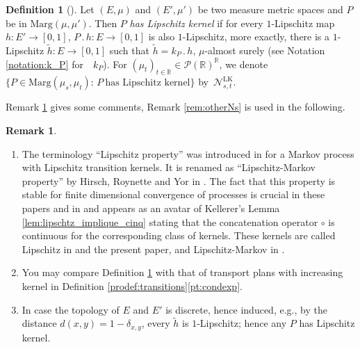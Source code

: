 \documentclass[JEP,XML,SOM,Unicode,NoEqCountersInSection,NoFloatCountersInSection,published]{cedram}
\newcommand{\ldot}{\mathbin{.}}
\theoremstyle{plain}
\theoremstyle{definition}
\newtheorem{defi}[them]{Definition}
\newtheorem{rem}[them]{Remark}
\newcommand{\ML}{\mathrm{LK}}
\newcommand{\p}{\mathcal{P}}
\newcommand{\ma}{\mathrm{Marg}}
\newcommand{\R}{\mathbb{R}}
\begin{document}
\begin{defi}[{\cite[Def.\,3]{Ke72}}]\label{defi:lipschitz} Let $(E,\mu)$ and $(E',\mu')$ be two measure metric spaces and $P$ be in $\ma(\mu,\mu')$. Then $P$ \emph{has Lipschitz kernel} if for every $1$-Lipschitz map $h:E'\to [0,1]$, $P\ldot h:E\to [0,1]$ is also $1$-Lipschitz, \ie more exactly, there is a $1$-Lipschitz $\tilde h:E\to [0,1]$ such that $\tilde h=k_P\ldot h$, $\mu$-almost surely (see Notation \ref{notation:k_P} for~ $k_P$). For $(\mu_t)_{t\in\R}\in\p(\R)^\R$, we denote $\{P\in\ma(\mu_s,\mu_t):\,P\ \text{has Lipschitz kernel}\}$ by~$\mathcal{N}^\ML_{s,t}$.
\end{defi}

Remark \ref{rem:comments_ml} gives some comments, Remark \ref{rem:otherNs} is used in the following.

\skpt
\begin{rem}\label{rem:comments_ml}
\begin{enumerate}
\item
The terminology ``Lipschitz property'' was introduced in \cite[Def.\,4.1]{Low} for a Markov process with Lipschitz transition kernels. It is renamed as ``Lipschitz-Markov property'' by Hirsch, Roynette and Yor in \cite{HiRoYo14}. The fact that this property is stable for finite dimensional convergence of processes is crucial in these papers and in \cite{Low2} and appears as an avatar of Kellerer's Lemma \ref{lem:lipschtz_implique_cinq} stating that the concatenation operator $\circ$ is continuous for the corresponding class of kernels. These kernels are called Lipschitz in \cite{Ju_seminaire,BeJu16} and the present paper, and Lipschitz-Markov in \cite{BHS}.

\item
You may compare Definition \ref{defi:lipschitz} with that of transport plans with increasing kernel in Definition \ref{prodef:transitions}\eqref{pt:condexp}.

\item
\cite[p.\,115]{Ke72} In case the topology of $E$ and $E'$ is discrete, hence induced, e.g., by the distance $d(x,y)=1-\delta_{x,y}$, every $\tilde h$ is $1$-Lipschitz; hence any $P$ has Lipschitz kernel.
\end{enumerate}
\end{rem}
\end{document}
